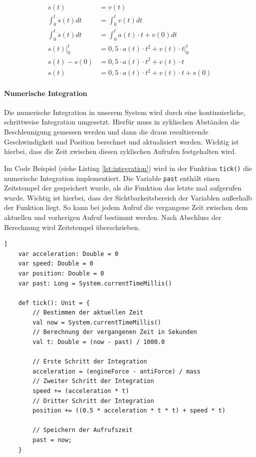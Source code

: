 \documentclass[12pt,a4paper,bibliography=totocnumbered,listof=totocnumbered, abstracton]{scrartcl}
\def\code#1{\texttt{#1}}
\theoremstyle{Umgebung}
\begin{document}
\begin{equation}
\begin{aligned}
	\dot{s}(t)                 & = v(t)                                              \\
	\int_{0}^{t} \dot{s}(t) dt & = \int_{0}^{t} v(t) dt                              \\
	\int_{0}^{t} \dot{s}(t) dt & = \int_{0}^{t} a(t) \cdot t + v(0) dt               \\
	s(t)\Big|_0^t              & = 0,5 \cdot a(t) \cdot t^2 + v(t) \cdot t \Big|_0^t \\
	s(t) - s(0)                & = 0,5 \cdot a(t) \cdot t^2 + v(t) \cdot t           \\
	s(t)                       & = 0,5 \cdot a(t) \cdot t^2 + v(t) \cdot t + s(0)
\end{aligned}
\end{equation}

\paragraph{Numerische Integration}

Die numerische Integration in unserem System wird durch eine kontinuierliche, schrittweise Integration umgesetzt. Hierfür muss in zyklischen Abständen die Beschleunigung gemessen werden und dann die draus resultierende Geschwindigkeit und Position berechnet und aktualisiert werden. Wichtig ist hierbei, dass die Zeit zwischen diesen zyklischen Aufrufen festgehalten wird.

Im Code Beispiel (siehe Listing \ref{lst:integration}) wird in der Funktion \code{tick()} die numerische Integration implementiert. Die Variable \code{past} enthält einen Zeitstempel der gespeichert wurde, als die Funktion das letzte mal aufgerufen wurde. Wichtig ist hierbei, dass der Sichtbarkeitsbereich der Variablen außerhalb der Funktion liegt. So kann bei jedem Aufruf die vergangene Zeit zwischen dem aktuellen und vorherigen Aufruf bestimmt werden. Nach Abschluss der Berechnung wird Zeitstempel überschrieben.

\begin{lstlisting}[style=myScalastyle, caption=Numerische Integration, label=lst:integration]]
	var acceleration: Double = 0
	var speed: Double = 0
	var position: Double = 0
	var past: Long = System.currentTimeMillis()

	def tick(): Unit = {
		// Bestimmen der aktuellen Zeit
		val now = System.currentTimeMillis()
		// Berechnung der vergangenen Zeit in Sekunden
		val t: Double = (now - past) / 1000.0 
		
		// Erste Schritt der Integration
		acceleration = (engineForce - antiForce) / mass
		// Zweiter Schritt der Integration
		speed += (acceleration * t)
		// Dritter Schritt der Integration
		position += ((0.5 * acceleration * t * t) + speed * t)

		// Speichern der Aufrufszeit
		past = now;
	}
\end{lstlisting}
\end{document}
